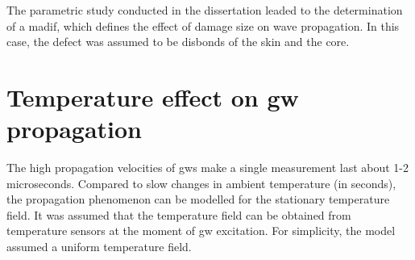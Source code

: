 \documentclass[11pt,a4paper,final]{report}
\theoremstyle{plain}
\begin{document}
The parametric study conducted in the dissertation leaded to the determination of a \ac{madif}, which defines the effect of damage size on wave propagation.
In this case, the defect was assumed to be disbonds of the skin and the core. \section{Temperature effect on \acl{gw} propagation}
\label{sec:temp}
 
The high propagation velocities of \acp{gw} make a single measurement last about 1-2 microseconds.
Compared to slow changes in ambient temperature (in seconds), the propagation phenomenon can be modelled for the stationary temperature field.
It was assumed that the temperature field can be obtained from temperature sensors at the moment of \ac{gw} excitation.
For simplicity, the model assumed a uniform temperature field.
\end{document}
